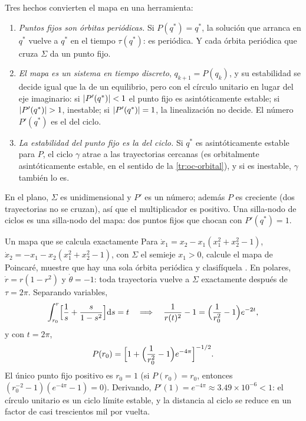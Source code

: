 Tres hechos convierten el mapa en una herramienta:
\begin{enumerate}
  \item \emph{Puntos fijos son órbitas periódicas.} Si $P(q^*)=q^*$, la solución que arranca en $q^*$ vuelve a $q^*$ en el tiempo $\tau(q^*)$: es periódica. Y cada órbita periódica que cruza $\Sigma$ da un punto fijo.
  \item \emph{El mapa es un sistema en tiempo discreto}, $q_{k+1}=P(q_k)$, y su estabilidad se decide igual que la de un equilibrio, pero con el círculo unitario en lugar del eje imaginario: si $\left\lvert P'(q^*)\right\rvert<1$ el punto fijo es asintóticamente estable; si $\left\lvert P'(q^*)\right\rvert>1$, inestable; si $\left\lvert P'(q^*)\right\rvert=1$, la linealización no decide. El número $P'(q^*)$ es el  del ciclo.
  \item \emph{La estabilidad del punto fijo es la del ciclo.} Si $q^*$ es asintóticamente estable para $P$, el ciclo $\gamma$ atrae a las trayectorias cercanas (es orbitalmente asintóticamente estable, en el sentido de la \cref{tr:oc-orbital}), y si es inestable, $\gamma$ también lo es.
\end{enumerate}
En el plano, $\Sigma$ es unidimensional y $P'$ es un número; además $P$ es creciente (dos trayectorias no se cruzan), así que el multiplicador es positivo. Una silla-nodo de ciclos es una silla-nodo del mapa: dos puntos fijos que chocan con $P'(q^*)=1$.

\begin{ejemplo}[label=ej:bf-mapa1]{Un mapa que se calcula exactamente}
Para $\dot x_1=x_2-x_1(x_1^2+x_2^2-1)$, $\dot x_2=-x_1-x_2(x_1^2+x_2^2-1)$, con $\Sigma$ el semieje $x_1>0$, calcule el mapa de Poincaré, muestre que hay una sola órbita periódica y clasifíquela \citep[Ejemplo~8.7.1]{Str15}.
\solucion En polares, $\dot r=r(1-r^2)$ y $\dot\theta=-1$: toda trayectoria vuelve a $\Sigma$ exactamente después de $\tau=2\pi$. Separando variables,
\[
  \int_{r_0}^{r}\Bigl[\frac1s+\frac{s}{1-s^2}\Bigr]\mathrm{d} s=t
  \quad\Longrightarrow\quad
  \frac1{r(t)^2}-1=\Bigl(\frac1{r_0^2}-1\Bigr)e^{-2t},
\]
y con $t=2\pi$,
\[
  P(r_0)=\Bigl[1+\Bigl(\frac1{r_0^2}-1\Bigr)e^{-4\pi}\Bigr]^{-1/2} .
\]
El único punto fijo positivo es $r_0=1$ (si $P(r_0)=r_0$, entonces $(r_0^{-2}-1)(e^{-4\pi}-1)=0$). Derivando, $P'(1)=e^{-4\pi}\approx3.49\times10^{-6}<1$: el círculo unitario es un ciclo límite estable, y la distancia al ciclo se reduce en un factor de casi trescientos mil por vuelta.
\end{ejemplo}


